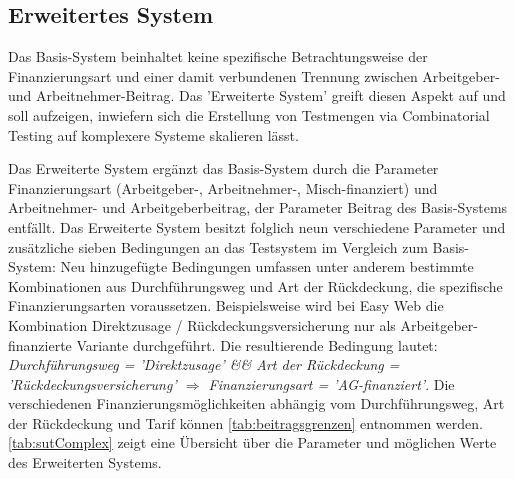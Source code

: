 \subsection{Erweitertes System}\label{subsec:ImplErweitertesModell}

Das Basis-System beinhaltet keine spezifische Betrachtungsweise der Finanzierungsart und einer damit verbundenen Trennung zwischen Arbeitgeber- und Arbeitnehmer-Beitrag. Das 'Erweiterte System' greift diesen Aspekt auf und soll aufzeigen, inwiefern sich die Erstellung von Testmengen via Combinatorial Testing auf komplexere Systeme skalieren lässt.

Das Erweiterte System ergänzt das Basis-System durch die Parameter Finanzierungsart (Arbeitgeber-, Arbeitnehmer-, Misch-finanziert) und Arbeitnehmer- und Arbeitgeberbeitrag, der Parameter Beitrag des Basis-Systems entfällt. Das Erweiterte System besitzt folglich neun verschiedene Parameter und zusätzliche sieben Bedingungen an das Testsystem im Vergleich zum Basis-System: Neu hinzugefügte Bedingungen umfassen unter anderem bestimmte Kombinationen aus Durchführungsweg und Art der Rückdeckung, die spezifische Finanzierungsarten voraussetzen. Beispielsweise wird bei Easy Web die Kombination Direktzusage / Rückdeckungsversicherung nur als Arbeitgeber-finanzierte Variante durchgeführt. Die resultierende Bedingung lautet:\textit{ Durchführungsweg = 'Direktzusage' \&\& Art der Rückdeckung = 'Rückdeckungsversicherung' $\Rightarrow$ Finanzierungsart = 'AG-finanziert'}. Die verschiedenen Finanzierungsmöglichkeiten abhängig vom Durchführungsweg, Art der Rückdeckung und Tarif können \autoref{tab:beitragsgrenzen} entnommen werden. \autoref{tab:sutComplex} zeigt eine Übersicht über die Parameter und möglichen Werte des Erweiterten Systems.

